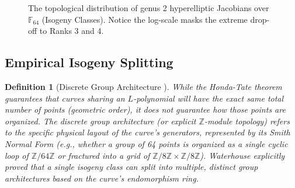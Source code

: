 \documentclass[11pt,letterpaper]{article}
\newtheorem{definition}[theorem]{Definition}
\begin{document}
\begin{figure}[htpb]
\centering
{}
\caption{The topological distribution of genus 2 hyperelliptic Jacobians over $\mathbb{F}_{64}$ (Isogeny Classes). Notice the log-scale masks the extreme drop-off to Ranks 3 and 4.}
\label{fig:rank_distribution}
\end{figure}

\subsection{Empirical Isogeny Splitting}
\begin{definition}[Discrete Group Architecture \cite{Waterhouse1969}]
While the Honda-Tate theorem guarantees that curves sharing an $L$-polynomial will have the exact same total number of points (geometric order), it does not guarantee how those points are organized. The \textit{discrete group architecture} (or explicit $\mathbb{Z}$-module topology) refers to the specific physical layout of the curve's generators, represented by its Smith Normal Form (e.g., whether a group of 64 points is organized as a single cyclic loop of $\mathbb{Z}/64\mathbb{Z}$ or fractured into a grid of $\mathbb{Z}/8\mathbb{Z} \times \mathbb{Z}/8\mathbb{Z}$). Waterhouse explicitly proved that a single isogeny class can split into multiple, distinct group architectures based on the curve's endomorphism ring.
\end{definition}
\end{document}
